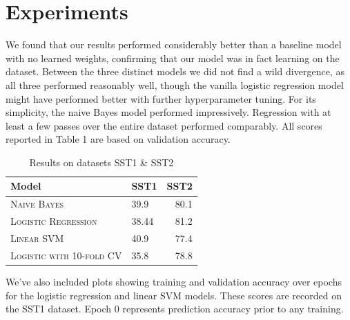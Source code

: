 \documentclass[11pt]{article}
\begin{document}
  \begin{algorithmic}[1]
    \Else{}
    \EndIf{}
    \EndFor{}
    \EndProcedure{}
  \end{algorithmic}

\section{Experiments}

We found that our results performed considerably better than a baseline model with no learned weights, confirming that our model was in fact learning on the dataset. Between the three distinct models we did not find a wild divergence, as all three performed reasonably well, though the vanilla logistic regression model might have performed better with further hyperparameter tuning. For its simplicity, the naive Bayes model performed impressively. Regression with at least a few passes over the entire dataset performed comparably. All scores reported in Table 1 are based on validation accuracy.

\begin{table}[h]
\centering
\begin{tabular}{llr}
 \toprule
 Model & SST1 & SST2 \\
 \midrule
 \textsc{Naive Bayes} & 39.9 & 80.1  \\
 \textsc{Logistic Regression} & 38.44 & 81.2 \\
 \textsc{Linear SVM} & 40.9 & 77.4 \\
 \textsc{Logistic with 10-fold CV} & 35.8 & 78.8 \\
 \bottomrule
\end{tabular}
\caption{\label{tab:results} Results on datasets SST1 \& SST2}
\end{table}

We've also included plots showing training and validation accuracy over epochs for the logistic regression and linear SVM models. These scores are recorded on the SST1 dataset. Epoch 0 represents prediction accuracy prior to any training.
\end{document}

